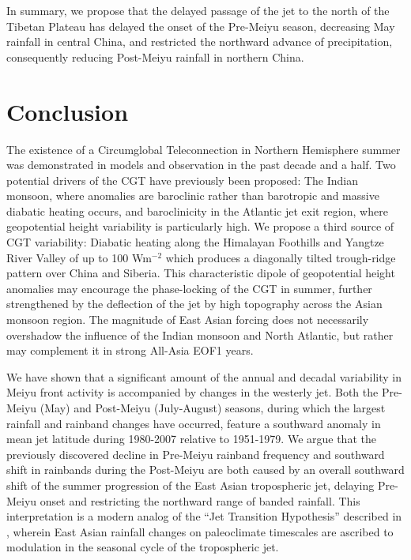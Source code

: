 	
	In summary, we propose that the delayed passage of the jet to the north of the Tibetan Plateau has delayed the onset of the Pre-Meiyu season, decreasing May rainfall in central China, and restricted the northward advance of precipitation, consequently reducing Post-Meiyu rainfall in northern China. 	
		 
\section{Conclusion}

	The existence of a Circumglobal Teleconnection in Northern Hemisphere summer was demonstrated in models and observation in the past decade and a half. Two potential drivers of the CGT have previously been proposed: The Indian monsoon, where anomalies are baroclinic rather than barotropic and massive diabatic heating occurs, and baroclinicity in the Atlantic jet exit region, where geopotential height variability is particularly high. We propose a third source of CGT variability: Diabatic heating along the Himalayan Foothills and Yangtze River Valley of up to 100 Wm$^{-2}$ which produces a diagonally tilted trough-ridge pattern over China and Siberia. This characteristic dipole of geopotential height anomalies may encourage the phase-locking of the CGT in summer, further strengthened by the deflection of the jet by high topography across the Asian monsoon region. The magnitude of East Asian forcing does not necessarily overshadow the influence of the Indian monsoon and North Atlantic, but rather may complement it in strong All-Asia EOF1 years.
	
	We have shown that a significant amount of the annual and decadal variability in Meiyu front activity is accompanied by changes in the westerly jet. Both the Pre-Meiyu (May) and Post-Meiyu (July-August) seasons, during which the largest rainfall and rainband changes have occurred, feature a southward anomaly in mean jet latitude during 1980-2007 relative to 1951-1979. We argue that the previously discovered decline in Pre-Meiyu rainband frequency and southward shift in rainbands during the Post-Meiyu are both caused by an overall southward shift of the summer progression of the East Asian tropospheric jet, delaying Pre-Meiyu onset and restricting the northward range of banded rainfall. This interpretation is a modern analog of the ``Jet Transition Hypothesis'' described in \citet{Chiang2015}, wherein East Asian rainfall changes on paleoclimate timescales are ascribed to modulation in the seasonal cycle of the tropospheric jet. 	
	
